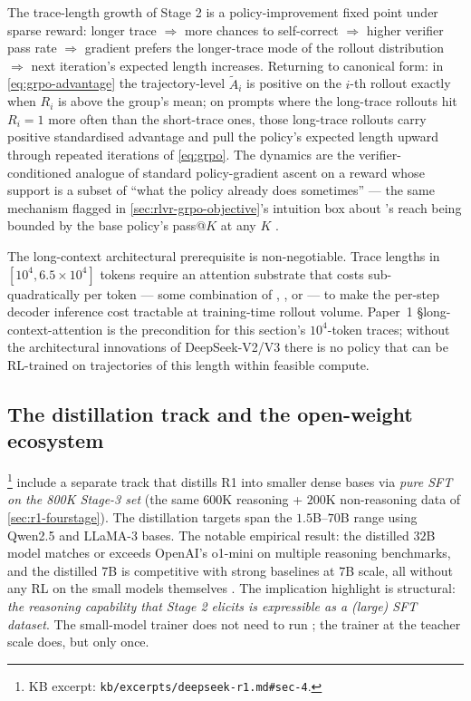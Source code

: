 \begin{analogy}
The trace-length growth of Stage 2 is a policy-improvement fixed
point under sparse reward: longer trace $\Rightarrow$ more chances to
self-correct $\Rightarrow$ higher verifier pass rate $\Rightarrow$
 gradient prefers the longer-trace mode of the rollout
distribution $\Rightarrow$ next iteration's expected length increases.
Returning to canonical form: in
\cref{eq:grpo-advantage} the trajectory-level $\tilde{A}_i$ is
positive on the $i$-th rollout exactly when $R_i$ is above the
group's mean; on prompts where the long-trace rollouts hit
$R_i = 1$ more often than the short-trace ones, those long-trace
rollouts carry positive standardised advantage and pull the policy's
expected length upward through repeated iterations of \cref{eq:grpo}.
The dynamics are the verifier-conditioned analogue of standard
policy-gradient ascent on a reward whose support is a subset of
``what the policy already does sometimes'' --- the same mechanism
flagged in \cref{sec:rlvr-grpo-objective}'s intuition box about
's reach being bounded by the base policy's pass@$K$ at any $K$
\citep{rlvr-limits-2025}.
\end{analogy}

The long-context architectural prerequisite is non-negotiable. Trace
lengths in $[10^4, 6.5\!\times\!10^4]$ tokens
\citep[\S 2.1]{deepseek-r1} require an attention substrate that
costs sub-quadratically per token --- some combination of , ,
or  --- to make the per-step decoder
inference cost tractable at training-time rollout volume. Paper~1
§long-context-attention is the precondition for this section's
$10^4$-token traces; without the architectural innovations of
DeepSeek-V2/V3 there is no policy that can be RL-trained on
trajectories of this length within feasible compute.

\subsection{The distillation track and the open-weight ecosystem}
\label{sec:r1-distillation}

\citet[\S 4]{deepseek-r1}\footnote{KB excerpt:
\nolinkurl{kb/excerpts/deepseek-r1.md#sec-4}.} include a separate track
that distills R1 into smaller dense bases via \emph{pure SFT on the
800K Stage-3 set} (the same $600$K reasoning + $200$K non-reasoning
data of \cref{sec:r1-fourstage}). The distillation targets span the
$1.5$B--$70$B range using Qwen2.5 and LLaMA-3 bases. The notable
empirical result: the distilled $32$B model matches or exceeds
OpenAI's o1-mini on multiple reasoning benchmarks, and the distilled
$7$B is competitive with strong baselines at $7$B scale, all without
any RL on the small models themselves \citep[\S 4]{deepseek-r1}. The
implication \citet{deepseek-r1} highlight is structural: \emph{the
reasoning capability that Stage 2 elicits is expressible as a (large)
SFT dataset}. The small-model trainer does not need to run ; the
trainer at the teacher scale does, but only once.

